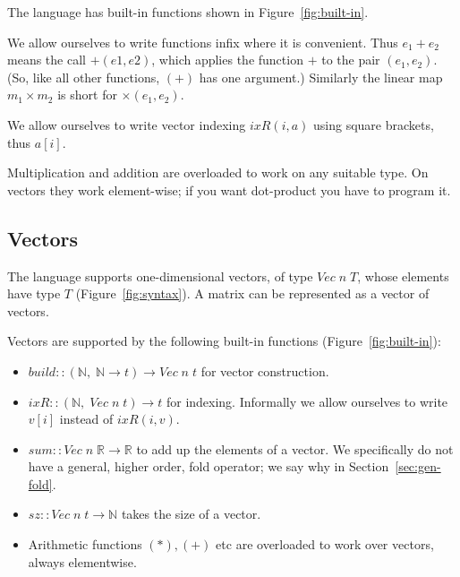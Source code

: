 \documentclass[sigplan,review]{acmart}
\renewcommand{\to}{\rightarrow}    %
\newcommand{\buildfun}{\mathit{build}}
\newcommand{\sumfunname}{\mathit{sum}}   %
\newcommand{\sizefun}{sz}
\newcommand{\deltafun}[2]{\delta(#1,#2)}
\newcommand{\indexfunname}{\mathit{ixR}} %
\newcommand{\indexfun}[2]{\indexfunname(#2,#1)} %
\renewcommand{\vector}[2]{\mathit{Vec}\;#1\;#2}   %
\newcommand{\real}{\mathbb{R}}       %
\newcommand{\nat}{\mathbb{N}}        %
\newcommand{\lmvcat}{\times}         %
\begin{document}
The language has built-in functions shown in Figure~\ref{fig:built-in}.

We allow ourselves to write functions infix where it is convenient.
Thus $e_1 + e_2$ means the call $+(e1,e2)$, which applies the function $+$ to
the pair $(e_1,e_2)$.  (So, like all other functions, $(+)$ has one argument.)
Similarly the linear map $m_1 \lmvcat m_2$ is short for $\lmvcat(e_1,e_2)$.

We allow ourselves to write vector indexing $\indexfun{a}{i}$ using square brackets, thus $a[i]$.

Multiplication and addition are overloaded to work on any suitable type.
On vectors they work element-wise; if you want dot-product you have to program it.



\subsection{Vectors}

The language supports one-dimensional vectors, of type $\vector{n}{T}$,
whose elements have type $T$ (Figure~\ref{fig:syntax}).
A matrix can be represented as a vector of vectors.

Vectors are supported by the following built-in functions (Figure~\ref{fig:built-in}):
\begin{itemize}
\item $\buildfun :: (\nat,\; \nat \to t) \to \vector{n}{t}$ for vector construction.
\item $\indexfunname :: (\nat,\; \vector{n}{t}) \to t$ for indexing.  Informally we allow ourselves to write
  $v[i]$ instead of $\indexfun{v}{i}$.
\item $\sumfunname :: \vector{n}{\real} \to \real$ to add up the elements of a vector.
We specifically do not have a general, higher order, fold operator;
we say why in Section~\ref{sec:gen-fold}.
\item $\sizefun :: \vector{n}{t} \to \nat$ takes the size of a vector.
\item Arithmetic functions $(*), (+)$ etc are overloaded to work over vectors, always elementwise.
\end{itemize}
\end{document}
